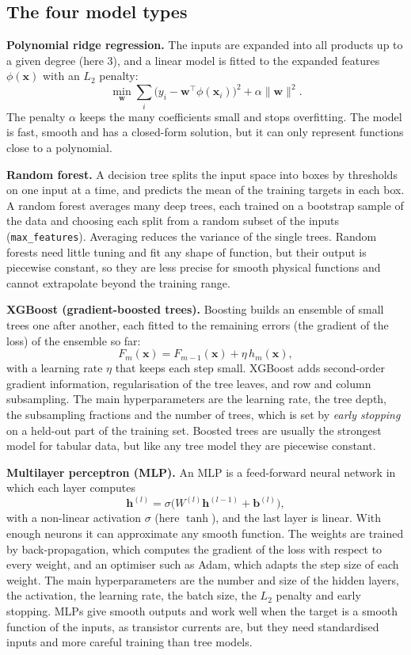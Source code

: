 \documentclass[10pt]{article}
\begin{document}
\subsection*{The four model types}

\textbf{Polynomial ridge regression.} The inputs are expanded into all products up to a given
degree (here 3), and a linear model is fitted to the expanded features $\phi(\mathbf{x})$ with an
$L_2$ penalty:
\[
\min_{\mathbf{w}} \sum_i \big(y_i - \mathbf{w}^\top \phi(\mathbf{x}_i)\big)^2 + \alpha \|\mathbf{w}\|^2 .
\]
The penalty $\alpha$ keeps the many coefficients small and stops overfitting. The model is fast,
smooth and has a closed-form solution, but it can only represent functions close to a polynomial.

\textbf{Random forest.} A decision tree splits the input space into boxes by thresholds on one
input at a time, and predicts the mean of the training targets in each box. A random forest
averages many deep trees, each trained on a bootstrap sample of the data and choosing each split
from a random subset of the inputs (\texttt{max\_features}). Averaging reduces the variance of the
single trees. Random forests need little tuning and fit any shape of function, but their output is
piecewise constant, so they are less precise for smooth physical functions and cannot extrapolate
beyond the training range.

\textbf{XGBoost (gradient-boosted trees).} Boosting builds an ensemble of small trees one after
another, each fitted to the remaining errors (the gradient of the loss) of the ensemble so far:
\[
F_m(\mathbf{x}) = F_{m-1}(\mathbf{x}) + \eta\, h_m(\mathbf{x}),
\]
with a learning rate $\eta$ that keeps each step small. XGBoost adds second-order gradient
information, regularisation of the tree leaves, and row and column subsampling. The main
hyperparameters are the learning rate, the tree depth, the subsampling fractions and the number of
trees, which is set by \emph{early stopping} on a held-out part of the training set. Boosted trees
are usually the strongest model for tabular data, but like any tree model they are piecewise
constant.

\textbf{Multilayer perceptron (MLP).} An MLP is a feed-forward neural network in which each layer
computes
\[
\mathbf{h}^{(l)} = \sigma\!\big(W^{(l)} \mathbf{h}^{(l-1)} + \mathbf{b}^{(l)}\big),
\]
with a non-linear activation $\sigma$ (here $\tanh$), and the last layer is linear. With enough
neurons it can approximate any smooth function. The weights are trained by back-propagation, which
computes the gradient of the loss with respect to every weight, and an optimiser such as Adam,
which adapts the step size of each weight. The main hyperparameters are the number and size of the
hidden layers, the activation, the learning rate, the batch size, the $L_2$ penalty and early
stopping. MLPs give smooth outputs and work well when the target is a smooth function of the
inputs, as transistor currents are, but they need standardised inputs and more careful training
than tree models.
\end{document}
